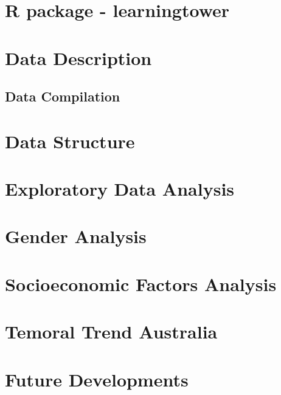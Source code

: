 \hypertarget{r-package---learningtower}{%
\section{R package - learningtower}\label{r-package---learningtower}}

\hypertarget{data-description}{%
\section{Data Description}\label{data-description}}

\hypertarget{data-compilation}{%
\subsection{Data Compilation}\label{data-compilation}}

\hypertarget{data-structure}{%
\section{Data Structure}\label{data-structure}}

\hypertarget{exploratory-data-analysis}{%
\section{Exploratory Data Analysis}\label{exploratory-data-analysis}}

\hypertarget{gender-analysis}{%
\section{Gender Analysis}\label{gender-analysis}}

\hypertarget{socioeconomic-factors-analysis}{%
\section{Socioeconomic Factors
Analysis}\label{socioeconomic-factors-analysis}}

\hypertarget{temoral-trend-australia}{%
\section{Temoral Trend Australia}\label{temoral-trend-australia}}

\hypertarget{future-developments}{%
\section{Future Developments}\label{future-developments}}

